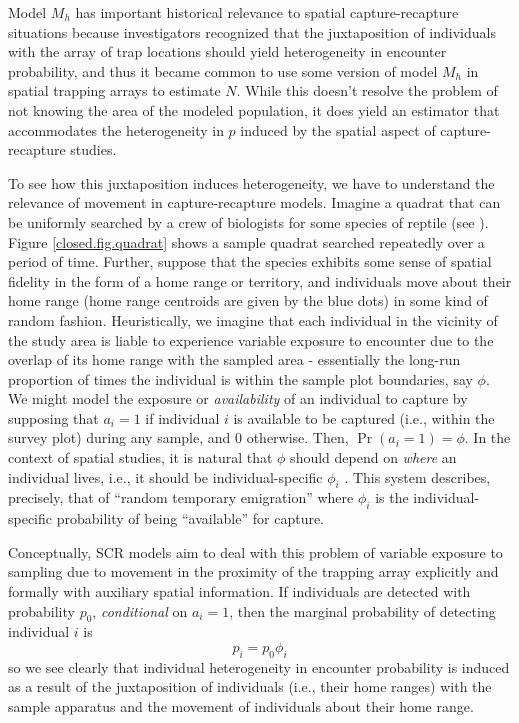 Model $M_{h}$ has important historical relevance to spatial
capture-recapture situations \citep{karanth:1995} because
investigators recognized that the juxtaposition of individuals with
the array of trap locations should yield heterogeneity in encounter
probability, and thus it became common to use some version of model $M_h$
in spatial trapping arrays to estimate $N$.  While this doesn't
resolve the problem of not knowing the area of the modeled population,
it does
yield an estimator that accommodates the heterogeneity in $p$ induced
by the spatial aspect of capture-recapture studies.

To see how this juxtaposition induces heterogeneity, we have to
understand the relevance of movement in capture-recapture models.
Imagine a quadrat that can be uniformly searched by a crew of
biologists for some species of reptile (see
\citet{royle_young:2008}).  Figure \ref{closed.fig.quadrat} shows a
sample quadrat searched repeatedly over a period of time. Further,
suppose that the species exhibits some sense of spatial fidelity in the
form of a home range or territory, and individuals move about their
home range (home range centroids are given by the blue dots) in some
kind of random fashion.
Heuristically, we imagine that each individual in
the vicinity of the study area is liable to experience variable
exposure to encounter due to the overlap of its home range with the
sampled area - essentially the long-run proportion of times the
individual is within the sample plot boundaries, say $\phi$. We
might model the exposure or {\it availability} of an individual to 
capture by supposing that
$a_{i} = 1$ if individual $i$ is available to be captured (i.e.,
within the survey plot) during any sample, and $0$ otherwise. Then,
$\Pr(a_{i}=1) = \phi$.  In the context of spatial studies, it is
natural that $\phi$ should depend on {\it where} an individual lives,
i.e., it should be individual-specific $\phi_{i}$
\citep{chandler_etal:2011}. This system describes, precisely, that of
``random temporary emigration'' \citep{kendall_etal:1997} where $\phi_{i}$
is the individual-specific probability of being ``available'' for
capture.

Conceptually, SCR models aim to deal with
this problem of variable exposure to sampling due to movement in the
proximity of the trapping array explicitly and formally with auxiliary
spatial information.  If individuals are detected with probability
$p_{0}$, {\it conditional} on $a_{i} = 1$, then the marginal
probability of detecting  individual $i$ is
\[
 p_{i} = p_{0}\phi_{i}
\]
so we see clearly that individual heterogeneity in encounter
probability is induced as a result of the juxtaposition of individuals
(i.e., their home ranges) with the sample apparatus and the movement
of individuals about their home range.

